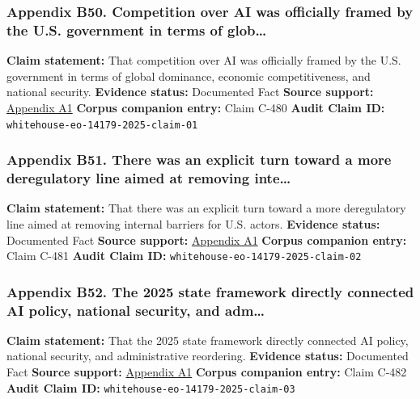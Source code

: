 \documentclass[
  american,
  11pt,
  letterpaper,
]{article}
\begin{document}
\subsubsection{Appendix B50. Competition over AI was officially framed
by the U.S. government in terms of
glob\ldots{}}\label{appendix-b50-competition-over-ai-was-officially-framed-by-the-u-s-government-in-terms-of-glob}

\textbf{Claim statement:} That competition over AI was officially framed
by the U.S. government in terms of global dominance, economic
competitiveness, and national security. \textbf{Evidence status:}
Documented Fact \textbf{Source support:}
\hyperref[appendix-a1-removing-barriers-to-american-leadership-in-artificial-intelligence]{Appendix
A1} \textbf{Corpus companion entry:} Claim C-480 \textbf{Audit Claim
ID:} \texttt{whitehouse-eo-14179-2025-claim-01}

\subsubsection{Appendix B51. There was an explicit turn toward a more
deregulatory line aimed at removing
inte\ldots{}}\label{appendix-b51-there-was-an-explicit-turn-toward-a-more-deregulatory-line-aimed-at-removing-inte}

\textbf{Claim statement:} That there was an explicit turn toward a more
deregulatory line aimed at removing internal barriers for U.S. actors.
\textbf{Evidence status:} Documented Fact \textbf{Source support:}
\hyperref[appendix-a1-removing-barriers-to-american-leadership-in-artificial-intelligence]{Appendix
A1} \textbf{Corpus companion entry:} Claim C-481 \textbf{Audit Claim
ID:} \texttt{whitehouse-eo-14179-2025-claim-02}

\subsubsection{Appendix B52. The 2025 state framework directly connected
AI policy, national security, and
adm\ldots{}}\label{appendix-b52-the-2025-state-framework-directly-connected-ai-policy-national-security-and-adm}

\textbf{Claim statement:} That the 2025 state framework directly
connected AI policy, national security, and administrative reordering.
\textbf{Evidence status:} Documented Fact \textbf{Source support:}
\hyperref[appendix-a1-removing-barriers-to-american-leadership-in-artificial-intelligence]{Appendix
A1} \textbf{Corpus companion entry:} Claim C-482 \textbf{Audit Claim
ID:} \texttt{whitehouse-eo-14179-2025-claim-03}
\end{document}
